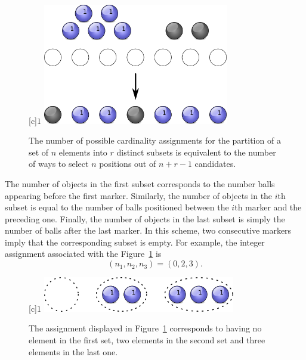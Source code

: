 \begin{figure}[htb!]
\begin{center}
\begin{psfrags}
[c]{$1$}
\includegraphics[height=5.28cm]{Figures/4Chapter/partitioning}
\end{psfrags}
\caption{The number of possible cardinality assignments for the partition of a set of $n$ elements into $r$ distinct subsets is equivalent to the number of ways to select $n$ positions out of $n + r - 1$ candidates.} 
\label{figure:Partitioning}
\end{center}
\end{figure}

The number of objects in the first subset corresponds to the number balls appearing before the first marker.
Similarly, the number of objects in the $i$th subset is equal to the number of balls positioned between the $i$th marker and the preceding one.
Finally, the number of objects in the last subset is simply the number of balls after the last marker.
In this scheme, two consecutive markers imply that the corresponding subset is empty.
For example, the integer assignment associated with the Figure~\ref{figure:Partitioning} is
\begin{equation*}
(n_1, n_2, n_3) = (0,2,3).
\end{equation*}

\begin{figure}[htb!]
\begin{center}
\begin{psfrags}
[c]{$1$}
\includegraphics[height=1.53cm]{Figures/4Chapter/partitioning2}
\end{psfrags}
\caption{The assignment displayed in Figure~\ref{figure:Partitioning} corresponds to having no element in the first set, two elements in the second set and three elements in the last one.}
\label{figure:Partitioning2}
\end{center}
\end{figure}

